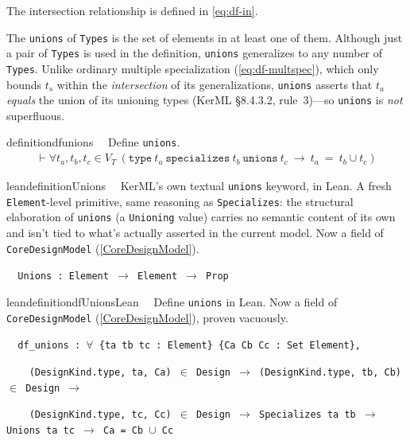 \pn The intersection relationship is defined in \ref{eq:df-in}.


\pn The \texttt{unions} of \texttt{Types} is the set of elements in at least one of them.  Although just a pair of \texttt{Types} is used in the definition,
\texttt{unions} generalizes to any number of \texttt{Types}.  Unlike ordinary multiple specialization (\ref{eq:df-multspec}), which only bounds $t_s$ within the \emph{intersection} of its generalizations, \texttt{unions} asserts that $t_a$ \emph{equals} the union of its unioning types (KerML \S8.4.3.2, rule~3)---so \texttt{unions} is \emph{not} superfluous.

\begin{restatable}{definition}{dfunions}~~ Define \texttt{unions}.
\begin{align}
\vdash \forall t_a , t_b, t_c \in V_T~(\texttt{type}~t_a~\texttt{specializes}~t_b~\texttt{unions}~t_c~ \rightarrow~ t_a~=~t_b \cup t_c)\label{eq:df-unions}\tag{df-unions}
\end{align}
\end{restatable}

\begin{restatable}{leandefinition}{Unions}~~ KerML's own textual \texttt{unions} keyword, in Lean.
A fresh \texttt{Element}-level primitive, same reasoning as \texttt{Specializes}: the structural elaboration of
\texttt{unions} (a \texttt{Unioning} value) carries no semantic content of its own and isn't tied to what's
actually asserted in the current model. Now a field of \texttt{CoreDesignModel} (\ref{CoreDesignModel}).

\texttt{~~Unions : Element $\to$ Element $\to$ Prop}
\label{Unions}
\end{restatable}

\begin{restatable}{leandefinition}{dfUnionsLean}~~ Define \texttt{unions} in Lean.
Now a field of \texttt{CoreDesignModel} (\ref{CoreDesignModel}), proven vacuously.

\texttt{~~df\_unions : $\forall$ \{ta tb tc : Element\} \{Ca Cb Cc : Set Element\},}

\texttt{~~~~(DesignKind.type, ta, Ca) $\in$ Design $\to$ (DesignKind.type, tb, Cb) $\in$ Design $\to$}

\texttt{~~~~(DesignKind.type, tc, Cc) $\in$ Design $\to$ Specializes ta tb $\to$ Unions ta tc $\to$ Ca = Cb $\cup$ Cc}
\label{df_unions}
\end{restatable}

